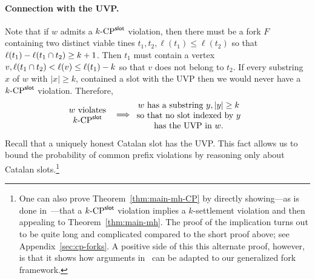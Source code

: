   \paragraph{Connection with the UVP.}
  Note that 
  if $w$ admits a ${k}\text{-}\mathrm{CP}^{\mathsf{slot}}$ violation, 
  then there must be a fork $F$ containing 
  two distinct viable tines $t_1, t_2, \ell(t_1) \leq \ell(t_2)$ 
  so that $\ell(t_1) - \ell(t_1 \cap t_2) \geq k + 1$. 
  Then $t_1$ must contain a vertex $v, \ell(t_1 \cap t_2) < \ell(v) \leq \ell(t_1) - k$ 
  so that $v$ does not belong to $t_2$. 
  If every substring $x$ of $w$ with $|x| \geq k$, contained a slot with the UVP then 
  we would never have a ${k}\text{-}\mathrm{CP}^{\mathsf{slot}}$ violation. 
  Therefore, 
  \begin{align}\label{eq:cp-uvp}
    \parbox{20mm}{\centering $w$ violates $\kSlotCP$}
    &\implies
    \parbox{45mm}{\centering
      $w$ has a substring $y, |y| \geq k$ so that 
      no slot indexed by $y$ has the UVP in $w$.
    }
  \end{align}


  Recall that a uniquely honest Catalan slot has the UVP. 
  This fact allows us to bound 
  the probability of common prefix violations by 
  reasoning only about Catalan slots.\footnote{ 
  One can also prove Theorem~\ref{thm:main-mh-CP} 
  by 
  directly showing---as is done in~\cite{LinearConsistency}---that 
  a ${k}\text{-}\mathrm{CP}^{\mathsf{slot}}$ violation implies a $k$-settlement violation 
  and then appealing to Theorem~\ref{thm:main-mh}. 
  The proof of the implication 
  turns out to be quite long and complicated 
  compared to the short proof above; 
  see Appendix~\ref{sec:cp-forks}.
  A positive side of this this alternate proof, however,  
  is that it shows how arguments in~\cite{LinearConsistency} 
  can be adapted to our generalized fork framework.
  }

